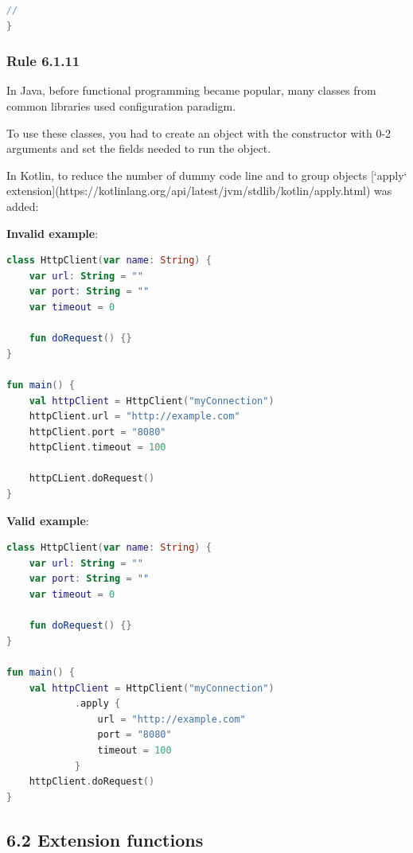 {{{{\begin{lstlisting}[language=Kotlin]
    //
}
\end{lstlisting}


\subsubsection*{\textbf{Rule 6.1.11}}
\leavevmode\newline

In Java, before functional programming became popular, many classes from common libraries used configuration paradigm.

To use these classes, you had to create an object with the constructor with 0-2 arguments and set the fields needed to run the object.

In Kotlin, to reduce the number of dummy code line and to group objects [`apply` extension](https://kotlinlang.org/api/latest/jvm/stdlib/kotlin/apply.html) was added:



\textbf{Invalid example}:

\begin{lstlisting}[language=Kotlin]
class HttpClient(var name: String) {
    var url: String = ""
    var port: String = ""
    var timeout = 0

    fun doRequest() {}
}

fun main() {
    val httpClient = HttpClient("myConnection")
    httpClient.url = "http://example.com"
    httpClient.port = "8080"
    httpClient.timeout = 100

    httpCLient.doRequest()
}

\end{lstlisting}


\textbf{Valid example}:

\begin{lstlisting}[language=Kotlin]
class HttpClient(var name: String) {
    var url: String = ""
    var port: String = ""
    var timeout = 0

    fun doRequest() {}
}

fun main() {
    val httpClient = HttpClient("myConnection")
            .apply {
                url = "http://example.com"
                port = "8080"
                timeout = 100
            }
    httpClient.doRequest()
}
\end{lstlisting}


\subsection*{\textbf{6.2 Extension functions}}

}}}}
